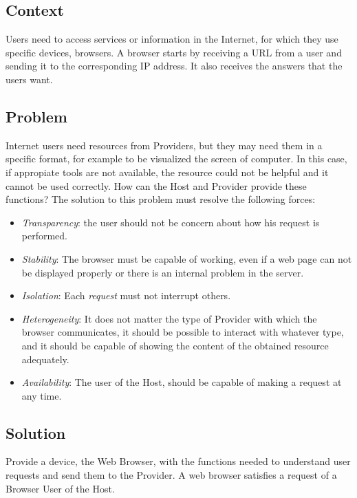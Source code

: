 \documentclass{sig-alternate-05-2015}
\begin{document}
  \subsection*{Context}
  Users need to access services or information in the Internet, for which they use specific devices, browsers. A browser starts by receiving a URL from a user and sending it to the corresponding IP address. It also receives the answers that the users want.

  \subsection*{Problem}
  Internet users need resources from Providers, but they may need them in a specific format, for example to be visualized the screen of computer. In this case, if appropiate tools are not available, the resource could not be helpful and it cannot be used correctly. How can the Host and Provider provide these functions? The solution to this problem must resolve the following forces:
  \begin{itemize}
    \item \textit{Transparency}: the user should not be concern about how his request is performed. 
    \item \textit{Stability}: The browser must be capable of working, even if a web page can not be displayed properly or there is an internal problem in the server.
    \item \textit{Isolation}: Each \textit{request} must not interrupt others.
    \item \textit{Heterogeneity}: It does not matter the type of Provider with which the browser communicates, it should be possible to interact with whatever type, and it should be capable of showing the content of the obtained resource adequately.
    \item \textit{Availability}: The user of the Host, should be capable of making a request at any time.
  \end{itemize}

  \subsection*{Solution}
  Provide a device, the Web Browser, with the functions needed to understand user requests and send them to the Provider. A web browser satisfies a request of a Browser User of the Host.
\end{document}
